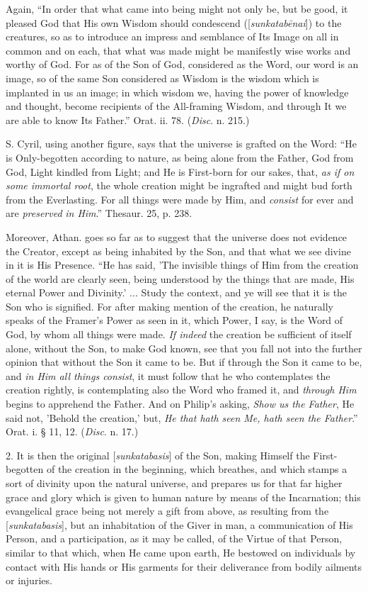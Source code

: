 Again, ``In order that what came into being might
not only be, but be good, it pleased God that His own Wisdom should
condescend ([\emph{sunkatab\={e}nai}])
to the creatures, so as to introduce an impress and semblance
of Its Image on all in common and on each, that what was made might be
manifestly wise works and worthy of God. For as of the Son of
God, considered as the Word, our word is an image, so of the same Son
considered as Wisdom is the wisdom which is implanted in us an image;
in which wisdom we, having the power of knowledge and thought, become
recipients of the All-framing Wisdom, and through It we are able to
know Its Father.'' Orat. ii. 78. (\emph{Disc}. n. 215.)

S. Cyril, using another figure, says that the
universe is grafted on the Word: ``He is Only-begotten according to
nature, as being alone from the Father, God from God, Light kindled
from Light; and He is First-born for our sakes, that, \emph{as
if on some immortal root}, the whole creation might be ingrafted
and might bud forth from the Everlasting. For all things were made by
Him, and \emph{consist} for ever and are \emph{preserved}
\emph{in Him}.'' Thesaur. 25, p.
238.

Moreover, Athan. goes so far as to suggest that
the universe does not evidence the Creator, except as being inhabited
by the Son, and that what we see divine in it is His Presence. ``He has
said, 'The invisible things of Him from the creation of the world are
clearly seen, being understood by the things that are made, His
eternal Power and Divinity.' ... Study the context, and ye will see
that it is the Son who is signified. For after making mention of the
creation, he naturally speaks of the Framer's Power as seen in it,
which Power, I say, is the Word of God, by whom all things were made. \emph{If
indeed} the creation be sufficient of itself alone, without the
Son, to make God known, see that you fall not into the further opinion
that without the Son it came to be. But if through the Son it
came to be, and \emph{in Him all
things consist}, it must follow that he who contemplates the
creation rightly, is contemplating also the Word who framed it, and \emph{through Him} begins to apprehend the Father. And on Philip's asking, \emph{Show
us the Father}, He said not, 'Behold the creation,' but, \emph{He
that hath seen Me, hath seen the Father}.'' Orat. i. § 11, 12. (\emph{Disc}. n. 17.)

2. It is then the original [\emph{sunkatabasis}]
of the Son, making Himself the First-begotten of the creation in the
beginning, which breathes, and which stamps a sort of divinity upon
the natural universe, and prepares us for that far higher grace and
glory which is given to human nature by means of the Incarnation; this
evangelical grace being not merely a gift from above, as resulting
from the [\emph{sunkatabasis}], but an inhabitation of the Giver in man, a communication of His
Person, and a participation, as it may be called, of the Virtue of
that Person, similar to that which, when He came upon earth, He
bestowed on individuals by contact with His hands or His garments for
their deliverance from bodily ailments or injuries.


